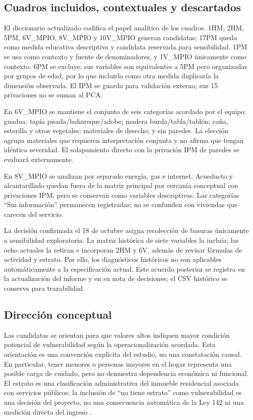 \subsection{Cuadros incluidos, contextuales y descartados}

El diccionario actualizado codifica el papel analítico de los cuadros. 1HM, 2HM, 5PM, 6V\_MPIO, 8V\_MPIO y 10V\_MPIO generan candidatas; 17PM queda como medida educativa descriptiva y candidata reservada para sensibilidad. 1PM se usa como contexto y fuente de denominadores, y 1V\_MPIO únicamente como contexto. 6PM se excluye: sus variables son equivalentes a 5PM pero organizadas por grupos de edad, por lo que incluirlo como otra medida duplicaría la dimensión observada. El IPM se guarda para validación externa; sus 15 privaciones no se suman al PCA.

En 6V\_MPIO se mantiene el conjunto de seis categorías acordado por el equipo: guadua; tapia pisada/bahareque/adobe; madera burda/tabla/tablón; caña, esterilla y otros vegetales; materiales de desecho; y sin paredes. La elección agrupa materiales que requieren interpretación conjunta y no afirma que tengan idéntica severidad. El solapamiento directo con la privación IPM de paredes se evaluará externamente.

En 8V\_MPIO se analizan por separado energía, gas e internet. Acueducto y alcantarillado quedan fuera de la matriz principal por cercanía conceptual con privaciones IPM, pero se conservan como variables descriptivas. Las categorías \enquote{Sin información} permanecen registradas; no se confunden con viviendas que carecen del servicio.

La decisión confirmada el 18 de octubre asigna recolección de basuras únicamente a sensibilidad exploratoria. La matriz histórica de siete variables la incluía; las ocho actuales la retiran e incorporan 2HM y 6V, además de revisar fórmulas de actividad y estrato. Por ello, los diagnósticos históricos no son aplicables automáticamente a la especificación actual. Este acuerdo posterior se registra en la actualización del informe y en su nota de decisiones; el CSV histórico se conserva para trazabilidad.

\subsection{Dirección conceptual}

Las candidatas se orientan para que valores altos indiquen mayor condición potencial de vulnerabilidad según la operacionalización acordada. Esta orientación es una convención explícita del estudio, no una constatación causal. En particular, tener menores o personas mayores en el hogar representa una posible carga de cuidado, pero no demuestra dependencia económica ni funcional. El estrato es una clasificación administrativa del inmueble residencial asociada con servicios públicos; la inclusión de \enquote{no tiene estrato} como vulnerabilidad es una decisión del proyecto, no una consecuencia automática de la Ley 142 ni una medición directa del ingreso \citep{dane_estratificacion}.

